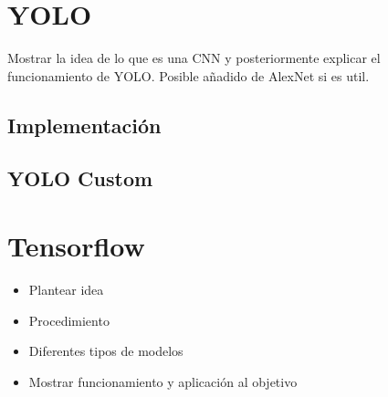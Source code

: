 \section{YOLO}
Mostrar la idea de lo que es una CNN y posteriormente explicar el funcionamiento de YOLO. Posible añadido de AlexNet si es util.

\subsection*{Implementación}


\subsection*{YOLO Custom}


\section{Tensorflow}

\begin{itemize}
	\item Plantear idea
	\item Procedimiento
	\item Diferentes tipos de modelos
	\item Mostrar funcionamiento y aplicación al objetivo
\end{itemize}